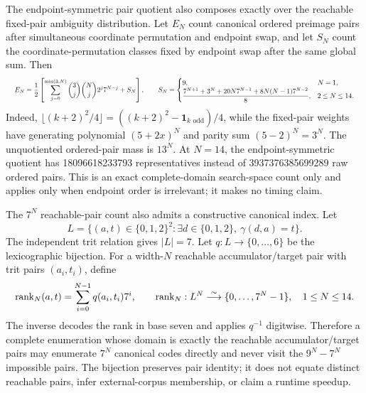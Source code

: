 \documentclass{article}
\newcommand{\fitmath}[1]{\resizebox{0.99\linewidth}{!}{$\displaystyle #1$}}
\begin{document}
The endpoint-symmetric pair quotient also composes exactly over the reachable
fixed-pair ambiguity distribution. Let $E_N$ count canonical ordered preimage
pairs after simultaneous coordinate permutation and endpoint swap, and let
$S_N$ count the coordinate-permutation classes fixed by endpoint swap after the
same global sum. Then
\begin{equation}
  \fitmath{%
    E_N=\frac{1}{2}\left[
      \sum_{j=0}^{\min(3,N)}\binom{3}{j}\binom{N}{j}2^j7^{N-j}+S_N
    \right],\qquad
    S_N=\begin{cases}
      9,&N=1,\\
      \dfrac{7^{N+1}+3^N+20N7^{N-1}+8N(N-1)7^{N-2}}{8},&2\leq N\leq14.
    \end{cases}
  }
  \label{eq:optimization-crazy-global-endpoint-symmetric-pair-quotient}
\end{equation}
Indeed,
$\lfloor(k+2)^2/4\rfloor=((k+2)^2-\mathbf{1}_{k\text{ odd}})/4$,
while the fixed-pair weights have generating polynomial $(5+2x)^N$ and parity
sum $(5-2)^N=3^N$. The unquotiented ordered-pair mass is $13^N$. At $N=14$,
the endpoint-symmetric quotient has 18096618233793 representatives instead of
3937376385699289 raw ordered pairs. This is an exact complete-domain
search-space count only and applies only when endpoint order is irrelevant; it
makes no timing claim.

The $7^N$ reachable-pair count also admits a constructive canonical index.
Let
\[
  L=\{(a,t)\in\{0,1,2\}^2:\exists d\in\{0,1,2\},\ \gamma(d,a)=t\}.
\]
The independent trit relation gives $|L|=7$. Let
$q:L\to\{0,\ldots,6\}$ be the lexicographic bijection. For a width-$N$
reachable accumulator/target pair with trit pairs $(a_i,t_i)$, define
\begin{equation}
  \fitmath{%
    \operatorname{rank}_N(a,t)
      =\sum_{i=0}^{N-1}q(a_i,t_i)7^i,
    \qquad
    \operatorname{rank}_N:
      L^N\overset{\sim}{\longrightarrow}\{0,\ldots,7^N-1\},
    \quad 1\leq N\leq14.
  }
  \label{eq:optimization-crazy-profile-reachable-pair-ranking}
\end{equation}
The inverse decodes the rank in base seven and applies $q^{-1}$ digitwise.
Therefore a complete enumeration whose domain is exactly the reachable
accumulator/target pairs may enumerate $7^N$ canonical codes directly and never
visit the $9^N-7^N$ impossible pairs. The bijection preserves pair identity; it
does not equate distinct reachable pairs, infer external-corpus membership, or
claim a runtime speedup.
\end{document}
